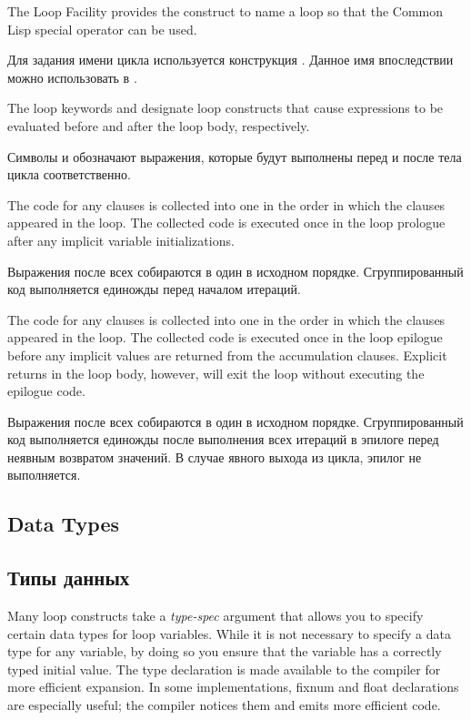 The Loop Facility provides the  construct to name a loop so that
the Common Lisp special operator  can be used.

Для задания имени цикла используется конструкция . Данное
имя впоследствии можно использовать в .

The loop keywords  and  designate loop constructs that cause
expressions to be evaluated before and after the loop body, respectively.

Символы  и  обозначают выражения, которые
будут выполнены перед и после тела цикла соответственно.

The code for any  clauses is collected into one
 in the order in which the clauses appeared in the loop.
The collected code is executed once in the loop prologue after any
implicit variable initializations.

Выражения после всех  собираются в один  в
исходном порядке. Сгруппированный код выполняется единожды перед
началом итераций.

The code for any  clauses is collected into one
 in the order in which the clauses appeared in the loop.
The collected code is executed once in the loop epilogue before any
implicit values are returned from the accumulation clauses.  Explicit
returns in the loop body, however, will exit the loop without
executing the epilogue code.

Выражения после всех  собираются в один  в
исходном порядке. Сгруппированный код выполняется единожды после
выполнения всех итераций в эпилоге перед неявным возвратом значений. В
случае явного выхода из цикла, эпилог не выполняется.

\subsection{Data Types}
\label{LOOP-TYPES-SECTION}

\subsection{Типы данных}
\label{LOOP-TYPES-SECTION}

Many loop constructs take a \emph{type-spec\/} argument that
allows you to specify  certain data types for loop variables.
While it is not necessary to specify a data type for any variable,
by doing so you ensure that the variable has a correctly typed initial
value.  The type declaration is made available to the compiler for
more efficient  
expansion. 
In some implementations,
fixnum and float declarations are especially
useful; the compiler notices them and emits more efficient code.


